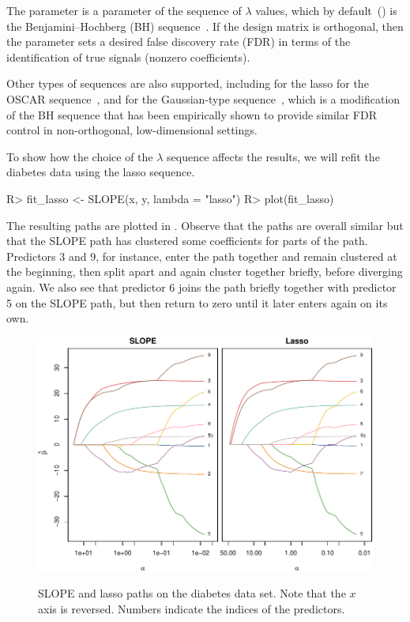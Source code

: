 \documentclass[article]{jss}
\makeatletter
\let\Cref\crtCref
\let\natwidth\Gin@nat@width
\makeatother
\begin{document}
The  parameter is a parameter of the sequence of \(\lambda\) values,
which by default~() is the Benjamini--Hochberg (BH)
sequence~\citep{bogdan2015}. If the design matrix is orthogonal, then the
 parameter sets a desired false discovery rate (FDR) in terms
of the identification of true signals (nonzero coefficients).

Other types of sequences are also supported,
including  for the lasso
 for the OSCAR sequence~\citep{bondell2008}, and
 for the Gaussian-type sequence~\citep{bogdan2015},
which is a modification of the BH sequence that has been empirically shown to
provide similar FDR control in non-orthogonal, low-dimensional settings.

To show how the choice of the \(\lambda\) sequence affects the
results, we will refit the diabetes data using the lasso sequence.

\begin{Code}
R> fit_lasso <- SLOPE(x, y, lambda = "lasso")
R> plot(fit_lasso)
\end{Code}

The resulting paths are plotted in \Cref{fig:diabetes}. Observe that the
paths are overall similar but that the SLOPE path has clustered
some coefficients for parts of the path. Predictors 3 and 9, for instance,
enter the path together and remain clustered at the beginning, then
split apart and again cluster together briefly, before diverging again.
We also see that predictor 6 joins the path briefly together
with predictor 5 on the SLOPE path, but then return to zero until
it later enters again on its own.

\begin{figure}[tp]
  \centering
  {\includegraphics[width=\natwidth]{images/diabetes-slope-lasso.pdf}}
  \caption{%
    SLOPE and lasso paths on the diabetes
    data set. Note that the \(x\) axis is reversed. Numbers indicate
    the indices of the predictors.
  }
  \label{fig:diabetes}
\end{figure}
\end{document}
